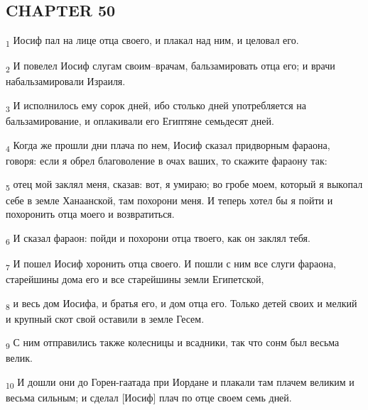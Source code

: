 \subsection{CHAPTER 50}
\begin{tcolorbox}
\textsubscript{1} Иосиф пал на лице отца своего, и плакал над ним, и целовал его.
\end{tcolorbox}
\begin{tcolorbox}
\textsubscript{2} И повелел Иосиф слугам своим--врачам, бальзамировать отца его; и врачи набальзамировали Израиля.
\end{tcolorbox}
\begin{tcolorbox}
\textsubscript{3} И исполнилось ему сорок дней, ибо столько дней употребляется на бальзамирование, и оплакивали его Египтяне семьдесят дней.
\end{tcolorbox}
\begin{tcolorbox}
\textsubscript{4} Когда же прошли дни плача по нем, Иосиф сказал придворным фараона, говоря: если я обрел благоволение в очах ваших, то скажите фараону так:
\end{tcolorbox}
\begin{tcolorbox}
\textsubscript{5} отец мой заклял меня, сказав: вот, я умираю; во гробе моем, который я выкопал себе в земле Ханаанской, там похорони меня. И теперь хотел бы я пойти и похоронить отца моего и возвратиться.
\end{tcolorbox}
\begin{tcolorbox}
\textsubscript{6} И сказал фараон: пойди и похорони отца твоего, как он заклял тебя.
\end{tcolorbox}
\begin{tcolorbox}
\textsubscript{7} И пошел Иосиф хоронить отца своего. И пошли с ним все слуги фараона, старейшины дома его и все старейшины земли Египетской,
\end{tcolorbox}
\begin{tcolorbox}
\textsubscript{8} и весь дом Иосифа, и братья его, и дом отца его. Только детей своих и мелкий и крупный скот свой оставили в земле Гесем.
\end{tcolorbox}
\begin{tcolorbox}
\textsubscript{9} С ним отправились также колесницы и всадники, так что сонм был весьма велик.
\end{tcolorbox}
\begin{tcolorbox}
\textsubscript{10} И дошли они до Горен-гаатада при Иордане и плакали там плачем великим и весьма сильным; и сделал [Иосиф] плач по отце своем семь дней.
\end{tcolorbox}
